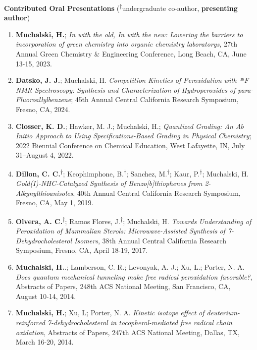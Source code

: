 \documentclass[11pt,letterpaper]{article}
\newcommand{\mhead}[1]{\leavevmode\marginpar{\sffamily\footnotesize #1}}
\begin{document}
\bigskip
\mhead{Conference \\ {Presentations}} %
\textbf{Contributed Oral Presentations} \newline
(\textsuperscript{$\dagger$}undergraduate co-author, \textbf{presenting author})\newline
\medskip
\begin{enumerate}[itemindent=0pt]
  \item{\textbf{Muchalski, H.}; \emph{In with the old, In with the new: Lowering the barriers to incorporation of green chemistry into organic chemistry laboratorys}, 27th Annual Green Chemistry \& Engineering Conference, Long Beach, CA, June 13-15, 2023.}
  \item{\textbf{Datsko, J. J.}; Muchalski, H. \emph{Competition Kinetics of Peroxidation with ¹⁹F NMR Spectroscopy: Synthesis and Characterization of Hydroperoxides of para-Fluoroallylbenzene}; 45th Annual Central California Research Symposium, Fresno, CA, 2024.}
  \item{\textbf{Closser, K. D.}; Hawker, M. J.; Muchalski, H.; \emph{Quantized Grading: An Ab Initio Approach to Using Specifications-Based Grading in Physical Chemistry}; 2022 Biennial Conference on Chemical Education, West Lafayette, IN, July 31--August 4, 2022.}
  \item{\textbf{Dillon, C. C.}\textsuperscript{$\dagger$}; Keophimphone, B.\textsuperscript{$\dagger$}; Sanchez, M.\textsuperscript{$\dagger$}; Kaur, P.\textsuperscript{$\dagger$}; Muchalski, H. \emph{Gold(I)-NHC-Catalyzed Synthesis of Benzo[b]thiophenes from 2-Alkynylthioanisoles}, 40th Annual Central California Research Symposium, Fresno, CA, May 1, 2019.}
  \item{\textbf{Olvera, A. C.}\textsuperscript{$\dagger$}; Ramos Flores, J.\textsuperscript{$\dagger$}; Muchalski, H. \emph{Towards Understanding of Peroxidation of Mammalian Sterols: Microwave-Assisted Synthesis of 7-Dehydrocholesterol Isomers}, 38th Annual Central California Research Symposium, Fresno, CA, April 18-19, 2017.}
  \item{\textbf{Muchalski, H.}.; Lamberson, C. R.; Levonyak, A. J.; Xu, L.; Porter, N. A. \emph{Does quantum mechanical tunneling make free radical peroxidation favorable?}, Abstracts of Papers, 248th ACS National Meeting, San Francisco, CA, August 10-14, 2014.}
  \item{\textbf{Muchalski, H.}; Xu, L; Porter, N. A. \emph{Kinetic isotope effect of deuterium-reinforced 7-dehydrocholesterol in tocopherol-mediated free radical chain oxidation}, Abstracts of Papers, 247th ACS National Meeting, Dallas, TX, March 16-20, 2014.}
\end{enumerate}
\end{document}
